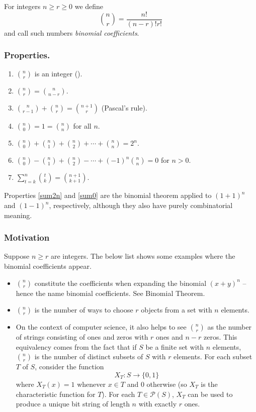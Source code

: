 \documentclass[12pt]{article}
\begin{document}
For integers $n\ge r \ge 0$ we define 
$$ 
{n\choose r} = \frac{n!}{(n-r)!r!}
$$ 
and call such numbers \emph{binomial coefficients}.

\subsubsection*{Properties.}
\begin{enumerate}
\item \label{isinteger}
   $n\choose r$ is an integer (). 
\item \label{reverse}
   ${n\choose r}={n\choose n-r}$.
\item \label{pascal}
   ${n\choose r-1}+{n\choose r}={n+1\choose r}$ (Pascal's rule).
\item \label{boundaryterms}
   ${n\choose 0}=1={n\choose n}$ for all $n$.
\item \label{sum2n}
   ${n\choose 0}+{n\choose 1}+{n\choose 2}+\cdots+{n\choose n}=2^n$.
\item \label{sum0}
   ${n\choose 0}-{n\choose 1}+{n\choose 2}-\cdots+(-1)^n{n\choose n}=0$ for $n>0$.
\item \label{sump1}
   $\sum_{t=k}^n {t\choose k }={n+1\choose k+1}$.
\end{enumerate}

Properties \ref{sum2n} and \ref{sum0} are the binomial theorem
applied to $(1+1)^n$ and $(1-1)^n$, respectively, although they also have purely combinatorial meaning.

\subsubsection*{Motivation}
Suppose $n\ge r$ are integers. 
The below list shows some examples where the binomial coefficients
appear. 
\begin{itemize}
\item $n\choose r$ constitute the coefficients when expanding the
binomial $(x+y)^n$ -- hence the name binomial coefficients.
See Binomial Theorem. 
\item $n\choose r$ is the number of ways to choose $r$ objects from a set with $n$ elements.
\item On the context of computer science, it also helps to see ${n\choose r}$ as the number 
of strings consisting of ones and zeros with $r$ ones and $n-r$ zeros.
This equivalency comes from the fact that
if $S$ be a finite set with $n$ elements, ${n\choose r}$ is the number of distinct 
subsets of $S$ with $r$ elements.  For each subset $T$ of $S$, consider the function
$$
  X_T\colon S \rightarrow \{0,1\}
$$
where $X_T(x) = 1$ whenever $x \in T$ and $0$ otherwise (so $X_T$ is the characteristic function 
for $T$).  For each $T \in \mathcal{P}(S)$, $X_T$ can be used to produce a unique bit 
string of length $n$ with exactly $r$ ones.
\end{itemize}
\end{document}

